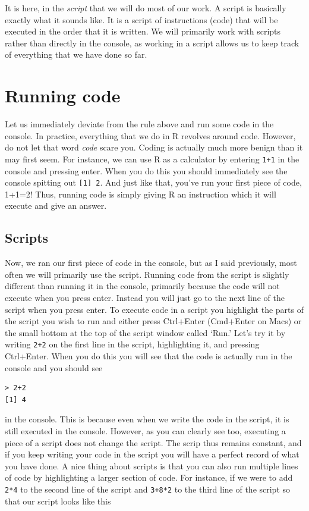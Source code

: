 \documentclass[
]{book}
\begin{document}
It is here, in the \emph{script} that we will do most of our work. A script is basically exactly what it sounds like. It is a script of instructions (code) that will be executed in the order that it is written. We will primarily work with scripts rather than directly in the console, as working in a script allows us to keep track of everything that we have done so far.

\hypertarget{running-code}{%
\section{Running code}\label{running-code}}

Let us immediately deviate from the rule above and run some code in the console. In practice, everything that we do in R revolves around code. However, do not let that word \emph{code} scare you. Coding is actually much more benign than it may first seem. For instance, we can use R as a calculator by entering \texttt{1+1} in the console and pressing enter. When you do this you should immediately see the console spitting out \texttt{{[}1{]}\ 2}. And just like that, you've run your first piece of code, 1+1=2! Thus, running code is simply giving R an instruction which it will execute and give an answer.

\hypertarget{scripts}{%
\subsection{Scripts}\label{scripts}}

Now, we ran our first piece of code in the console, but as I said previously, most often we will primarily use the script. Running code from the script is slightly different than running it in the console, primarily because the code will not execute when you press enter. Instead you will just go to the next line of the script when you press enter. To execute code in a script you highlight the parts of the script you wish to run and either press Ctrl+Enter (Cmd+Enter on Macs) or the small bottom at the top of the script window called `Run.' Let's try it by writing \texttt{2+2} on the first line in the script, highlighting it, and pressing Ctrl+Enter. When you do this you will see that the code is actually run in the console and you should see

\begin{verbatim}
> 2+2 
[1] 4
\end{verbatim}

in the console. This is because even when we write the code in the script, it is still executed in the console. However, as you can clearly see too, executing a piece of a script does not change the script. The scrip thus remains constant, and if you keep writing your code in the script you will have a perfect record of what you have done. A nice thing about scripts is that you can also run multiple lines of code by highlighting a larger section of code. For instance, if we were to add \texttt{2*4} to the second line of the script and \texttt{3+8*2} to the third line of the script so that our script looks like this
\end{document}
